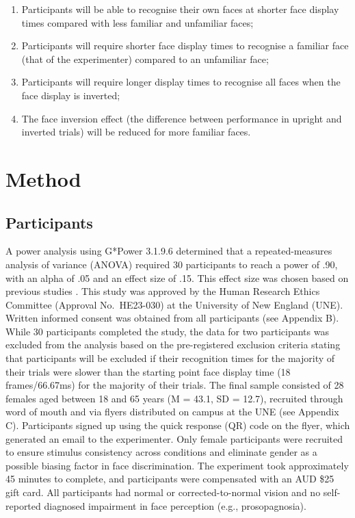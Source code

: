 \documentclass[
  10pt,
  letterpaper,
]{article}
\begin{document}
\begin{enumerate}
\def\labelenumi{\arabic{enumi}.}
\item
  Participants will be able to recognise their own faces at shorter face
  display times compared with less familiar and unfamiliar faces;
\item
  Participants will require shorter face display times to recognise a
  familiar face (that of the experimenter) compared to an unfamiliar
  face;
\item
  Participants will require longer display times to recognise all faces
  when the face display is inverted;
\item
  The face inversion effect (the difference between performance in
  upright and inverted trials) will be reduced for more familiar faces.
\end{enumerate}

\section{Method}\label{method}

\subsection{Participants}\label{participants}

A power analysis using G*Power 3.1.9.6 \citep{faul2009a} determined that
a repeated-measures analysis of variance (ANOVA) required 30
participants to reach a power of .90, with an alpha of .05 and an effect
size of .15. This effect size was chosen based on previous studies
\citep{campbell2021a, zimmermann2019a}. This study was approved by the
Human Research Ethics Committee (Approval No.~HE23-030) at the
University of New England (UNE). Written informed consent was obtained
from all participants (see Appendix B). While 30 participants completed
the study, the data for two participants was excluded from the analysis
based on the pre-registered exclusion criteria stating that participants
will be excluded if their recognition times for the majority of their
trials were slower than the starting point face display time (18
frames/66.67ms) for the majority of their trials. The final sample
consisted of 28 females aged between 18 and 65 years (M = 43.1, SD =
12.7), recruited through word of mouth and via flyers distributed on
campus at the UNE (see Appendix C). Participants signed up using the
quick response (QR) code on the flyer, which generated an email to the
experimenter. Only female participants were recruited to ensure stimulus
consistency across conditions and eliminate gender as a possible biasing
factor in face discrimination. The experiment took approximately 45
minutes to complete, and participants were compensated with an AUD \$25
gift card. All participants had normal or corrected-to-normal vision and
no self-reported diagnosed impairment in face perception (e.g.,
prosopagnosia).
\end{document}
